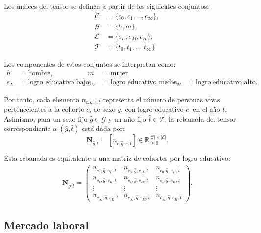 \documentclass[11pt]{article}
\begin{document}
Los índices del tensor se definen a partir de los siguientes conjuntos:
\begin{align*}
\mathcal{C} &= \{c_0,c_1,\ldots,c_\infty\}, \\
\mathcal{G} &= \{h,m\}, \\
\mathcal{E} &= \{e_L,e_M,e_H\}, \\
\mathcal{T} &= \{t_0,t_1,\ldots,t_\infty\}.
\end{align*}

Los componentes de estos conjuntos se interpretan como:
\begin{align*}
h &= \text{hombre}, 
& m &= \text{mujer}, \\[0.2cm]
e_L &= \text{logro educativo bajo}, 
& e_M &= \text{logro educativo medio}, 
& e_H &= \text{logro educativo alto}.
\end{align*}

Por tanto, cada elemento \(n_{c,g,e,t}\) representa el número de personas vivas pertenecientes a la cohorte \(c\), de sexo \(g\), con logro educativo \(e\), en el año \(t\). Asimismo, para un sexo fijo \(\hat{g}\in\mathcal{G}\) y un año fijo \(\hat{t}\in\mathcal{T}\), la rebanada del tensor correspondiente a \((\hat{g},\hat{t})\) está dada por:
\[
\mathbf{N}_{\hat{g},\hat{t}}
=
[n_{c,\hat{g},e,\hat{t}}]
\in
\mathbb{R}_{\geq 0}^{|\mathcal{C}| \times |\mathcal{E}|}.
\]

Esta rebanada es equivalente a una matriz de cohortes por logro educativo:
\begin{align*}
\mathbf{N}_{\hat{g},\hat{t}}
=
\begin{pmatrix}
n_{c_0,\hat{g},e_L,\hat{t}} 
& n_{c_0,\hat{g},e_M,\hat{t}} 
& n_{c_0,\hat{g},e_H,\hat{t}} \\[0.2cm]
n_{c_1,\hat{g},e_L,\hat{t}} 
& n_{c_1,\hat{g},e_M,\hat{t}} 
& n_{c_1,\hat{g},e_H,\hat{t}} \\
\vdots & \vdots & \vdots \\
n_{c_\infty,\hat{g},e_L,\hat{t}} 
& n_{c_\infty,\hat{g},e_M,\hat{t}} 
& n_{c_\infty,\hat{g},e_H,\hat{t}}
\end{pmatrix}.
\end{align*}




\subsection{Mercado laboral}
\end{document}
